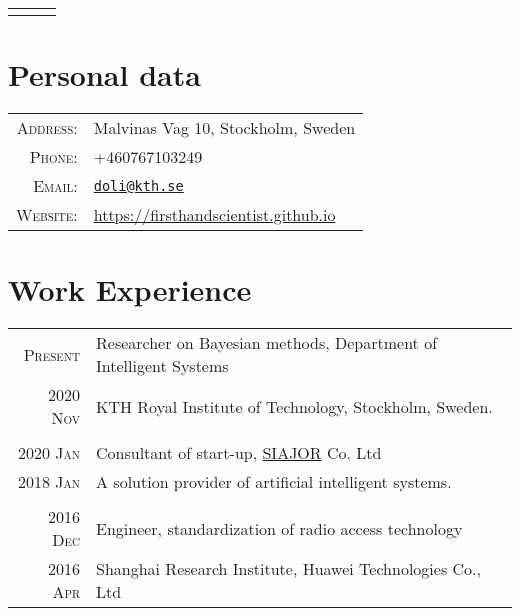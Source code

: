 \documentclass[a4paper,10pt]{article}
\begin{document}
\pagestyle{empty}


\begin{center}
  \begin{tabular}{lcr}
    \par{\centering{\Huge Dong Liu}\bigskip\par} & & %
  \end{tabular}
\end{center}

\section{Personal data}

\begin{tabular}{rl}
  \textsc{Address:} & Malvinas Vag 10, Stockholm, Sweden \\
  \textsc{Phone:} & +460767103249 \\
  \textsc{Email:} & \href{mailto:doli@kth.se}{\nolinkurl{doli@kth.se}} \\
  \textsc{Website:} & \href{https://firsthandscientist.github.io}{https://firsthandscientist.github.io}\\
\end{tabular}


\section{Work Experience}
\begin{tabular}{r|p{13cm}}
  \textsc{Present}  & Researcher on Bayesian methods, Department of Intelligent Systems \\
  \textsc{2020 Nov}  & KTH Royal Institute of Technology, Stockholm, Sweden.\\
  \multicolumn{2}{c}{} \\

  \textsc{2020 Jan}  & Consultant of start-up, \href{http://www.siajor.com/}{SIAJOR} Co. Ltd \\
  \textsc{2018 Jan}  & A solution provider of artificial intelligent systems. \\
  \multicolumn{2}{c}{} \\

  \textsc{2016 Dec}  & Engineer, standardization of radio access technology  \\
  \textsc{2016 Apr}  & Shanghai Research Institute, Huawei Technologies Co., Ltd \\
\end{tabular}
\end{document}
